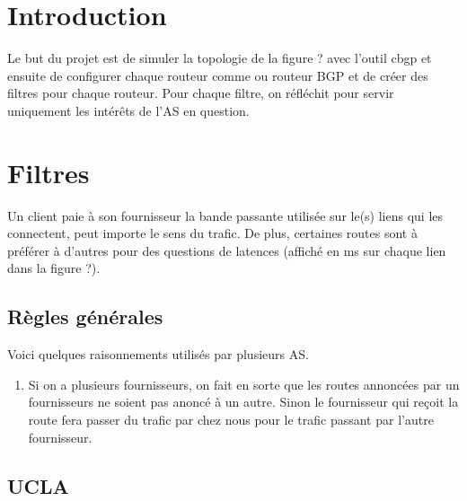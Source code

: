 \documentclass[a4paper, 12pt]{report}
\begin{document}


\section*{Introduction}
Le but du projet est de simuler la topologie de la figure ? avec l'outil cbgp et ensuite de configurer chaque routeur comme ou routeur BGP et de créer des filtres pour chaque routeur.
Pour chaque filtre, on réfléchit pour servir uniquement les intérêts de l'AS en question.

\section{Filtres}
Un client paie à son fournisseur la bande passante utilisée sur le(s) liens qui les connectent, peut importe le sens du trafic.
De plus, certaines routes sont à préférer à d'autres pour des questions de latences (affiché en ms sur chaque lien dans la figure ?).
\subsection{Règles générales}
Voici quelques raisonnements utilisés par plusieurs AS.
\begin{enumerate}
 \item Si on a plusieurs fournisseurs, on fait en sorte que les routes annoncées par un fournisseurs ne soient pas anoncé à un autre.
 Sinon le fournisseur qui reçoit la route fera passer du trafic par chez nous pour le trafic passant par l'autre fournisseur.
\end{enumerate}

\subsection{UCLA}
\end{document}
